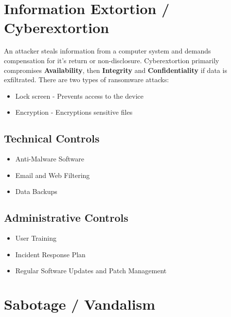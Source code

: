 \documentclass[12pt letter]{report}
\begin{document}
\section{Information Extortion / Cyberextortion}

An attacker steals information from a computer system and demands
compensation for it's return or non-disclosure. Cyberextortion
primarily compromises \textbf{Availability}, then \textbf{Integrity}
and \textbf{Confidentiality} if data is exfiltrated. There are two
types of ransomware attacks:
\begin{itemize}
  \item Lock screen - Prevents access to the device
  \item Encryption - Encryptions sensitive files
\end{itemize}

\subsection{Technical Controls}
\begin{itemize}
  \item Anti-Malware Software
  \item Email and Web Filtering
  \item Data Backups
\end{itemize}

\subsection{Administrative Controls}

\begin{itemize}
  \item User Training
  \item Incident Response Plan
  \item Regular Software Updates and Patch Management
\end{itemize}

\section{Sabotage / Vandalism}


\end{document}
